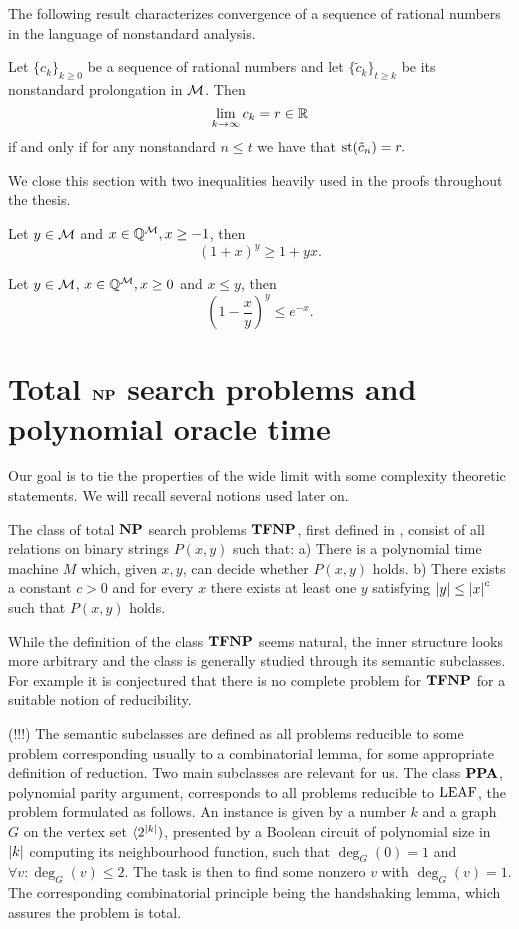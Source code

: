 The following result characterizes convergence of a sequence of rational numbers in the language of nonstandard analysis.

\begin{thrm*}
Let $\{c_k\}_{k\geq 0}$ be a sequence of rational numbers and let $\{\tilde c_k\}_{t\geq k}$ be its nonstandard prolongation in $\mathcal{M}$. Then \[\lim_{k\to\infty}c_k = r \in \mathbb{R}\]
if and only if for any nonstandard $n\leq t$ we have that
$\text{st}(\tilde c_n)=r.$
\end{thrm*}

We close this section with two inequalities heavily used in the proofs throughout the thesis.

\begin{thrm*}
Let $y \in \mathcal{M}$ and $x\in \mathbb{Q}^{\mathcal{M}}, x\geq -1$, then
\[(1+x)^y \geq 1+yx.\]
\end{thrm*}

\begin{thrm*}
Let $y \in \mathcal{M}$, $x\in \mathbb{Q}^{\mathcal{M}}, x\geq 0$ and $x\leq y$, then
\[\left(1-\frac{x}{y}\right)^y \leq e^{-x}.\]
\end{thrm*}

\section*{Total $\textbf{NP}$ search problems and polynomial oracle time}

Our goal is to tie the properties of the wide limit with some complexity theoretic statements. We will recall several notions used later on.

The class of total $\textbf{NP}$ search problems $\textbf{TFNP}$, first defined in \cite{megiddo1991total}, consist of all relations on binary strings $P(x,y)$ such that: a) There is a polynomial time machine $M$ which, given $x,y$, can decide whether $P(x,y)$ holds. b) There exists a constant $c>0$ and for every $x$ there exists at least one $y$ satisfying $\left|{y}\right|\leq \left|{x}\right|^c$ such that $P(x,y)$ holds.

While the definition of the class $\textbf{TFNP}$ seems natural, the inner structure looks more arbitrary and the class is generally studied through its semantic subclasses. For example it is conjectured that there is no complete problem for $\textbf{TFNP}$ \cite{goldberg2018tfnp} for a suitable notion of reducibility.

(!!!) The semantic subclasses are defined as all problems reducible to some problem corresponding usually to a combinatorial lemma, for some appropriate definition of reduction. Two main subclasses are relevant for us. The class $\textbf{PPA}$, polynomial parity argument, corresponds to all problems reducible to $\text{LEAF}$, the problem formulated as follows. An instance is given by a number $k$ and a graph $G$ on the vertex set $\langle 2^{\left|{k}\right|})$, presented by a Boolean circuit of polynomial size in $\left|{k}\right|$ computing its neighbourhood function, such that $\deg_G(0)=1$ and $\forall v: \deg_G(v)\leq 2$. The task is then to find some nonzero $v$ with $\deg_G(v)=1$. The corresponding combinatorial principle being the handshaking lemma, which assures the problem is total. 

